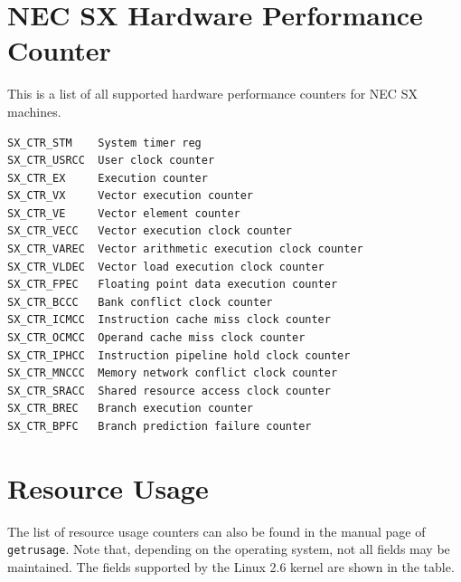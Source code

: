 \documentclass[a4paper,twoside,12pt,BCOR12mm]{scrbook}
\begin{document}
\section{NEC SX Hardware Performance Counter}
\label{sec:necsx_pc}
This is a list of all supported hardware performance counters for NEC SX machines.
\latex{\begin{small}}
\begin{verbatim}
SX_CTR_STM    System timer reg
SX_CTR_USRCC  User clock counter
SX_CTR_EX     Execution counter
SX_CTR_VX     Vector execution counter
SX_CTR_VE     Vector element counter
SX_CTR_VECC   Vector execution clock counter
SX_CTR_VAREC  Vector arithmetic execution clock counter
SX_CTR_VLDEC  Vector load execution clock counter
SX_CTR_FPEC   Floating point data execution counter
SX_CTR_BCCC   Bank conflict clock counter
SX_CTR_ICMCC  Instruction cache miss clock counter
SX_CTR_OCMCC  Operand cache miss clock counter
SX_CTR_IPHCC  Instruction pipeline hold clock counter
SX_CTR_MNCCC  Memory network conflict clock counter
SX_CTR_SRACC  Shared resource access clock counter
SX_CTR_BREC   Branch execution counter
SX_CTR_BPFC   Branch prediction failure counter
\end{verbatim}
\latex{\end{small}}

\latex{\newpage}


\section{Resource Usage}
\label{sec:rusage_list}

The list of resource usage counters can also be found in the 
manual page of \texttt{getrusage}. Note that, depending on the operating
system, not all fields may be maintained. The fields supported
by the Linux 2.6 kernel are shown in the table.
\end{document}
